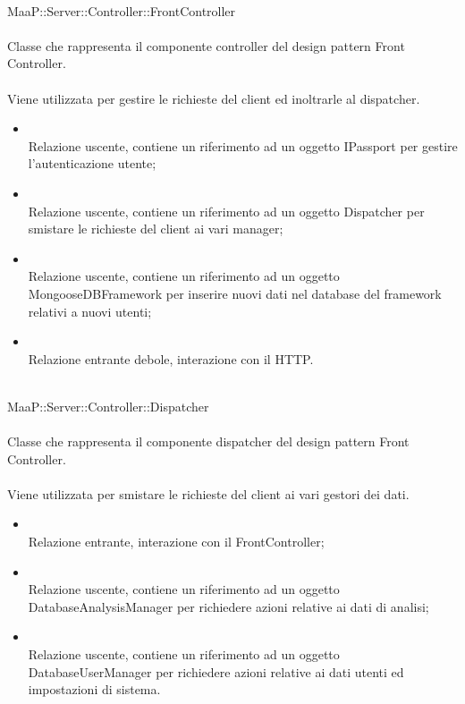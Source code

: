 \\
MaaP::Server::Controller::FrontController\\
\\
Classe che rappresenta il componente controller del design pattern Front Controller.\\
\\
Viene utilizzata per gestire le richieste del client ed inoltrarle al dispatcher.\\
\begin{itemize}
\item{}\\
Relazione uscente, contiene un riferimento ad un oggetto IPassport per gestire l'autenticazione utente;
\item{}\\
Relazione uscente, contiene un riferimento ad un oggetto Dispatcher per smistare le richieste del client ai vari manager;
\item{}\\
Relazione uscente, contiene un riferimento ad un oggetto MongooseDBFramework per inserire nuovi dati nel database del framework relativi a nuovi utenti;
\item{}\\
Relazione entrante debole, interazione con il  HTTP.
\end{itemize}

\\
MaaP::Server::Controller::Dispatcher\\
\\
Classe che rappresenta il componente dispatcher del design pattern Front Controller.\\
\\
Viene utilizzata per smistare le richieste del client ai vari gestori dei dati.\\
\begin{itemize}
\item{}\\
Relazione entrante, interazione con il FrontController;
\item{}\\
Relazione uscente, contiene un riferimento ad un oggetto DatabaseAnalysisManager per richiedere azioni relative ai dati di analisi;
\item{}\\
Relazione uscente, contiene un riferimento ad un oggetto DatabaseUserManager per richiedere azioni relative ai dati utenti ed impostazioni di sistema.
\end{itemize}


